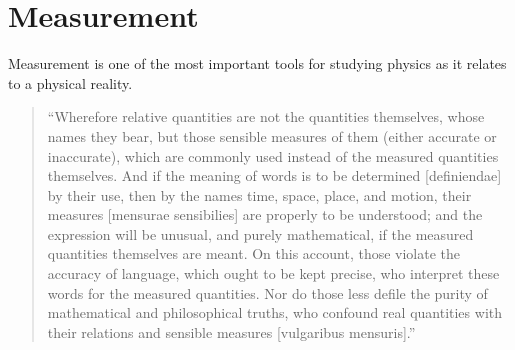 \section{Measurement}

Measurement is one of the most important tools for studying physics as it relates to a physical reality. 

\begin{quotation}
	``Wherefore relative quantities are not the quantities themselves, whose names they bear, but those sensible measures of them (either accurate or inaccurate), which are commonly used instead of the measured quantities themselves. And if the meaning of words is to be determined [definiendae] by their use, then by the names time, space, place, and motion, their measures [mensurae sensibilies] are properly to be understood; and the expression will be unusual, and purely mathematical, if the measured quantities themselves are meant. On this account, those violate the accuracy of language, which ought to be kept precise, who interpret these words for the measured quantities. Nor do those less defile the purity of mathematical and philosophical truths, who confound real quantities with their relations and sensible measures [vulgaribus mensuris].'' \cite{bib:Newtons Scholium}
\end{quotation}





















